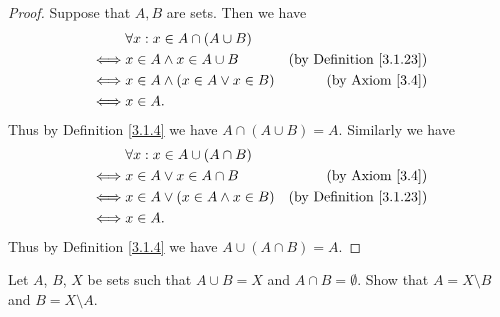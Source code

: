 \begin{proof}
    Suppose that \(A, B\) are sets.
    Then we have
    \begin{align*}
             & \forall x : x \in A \cap (A \cup B)                                        \\
        \iff & x \in A \land x \in A \cup B         & \text{(by Definition \ref{3.1.23})} \\
        \iff & x \in A \land (x \in A \lor x \in B) & \text{(by Axiom \ref{3.4})}         \\
        \iff & x \in A.
    \end{align*}
    Thus by Definition \ref{3.1.4} we have \(A \cap (A \cup B) = A\).
    Similarly we have
    \begin{align*}
             & \forall x : x \in A \cup (A \cap B)                                        \\
        \iff & x \in A \lor x \in A \cap B          & \text{(by Axiom \ref{3.4})}         \\
        \iff & x \in A \lor (x \in A \land x \in B) & \text{(by Definition \ref{3.1.23})} \\
        \iff & x \in A.
    \end{align*}
    Thus by Definition \ref{3.1.4} we have \(A \cup (A \cap B) = A\).
\end{proof}

\begin{exercise}\label{ex 3.1.9}
    Let \(A\), \(B\), \(X\) be sets such that \(A \cup B = X\) and \(A \cap B = \emptyset\).
    Show that \(A = X \setminus B\) and \(B = X \setminus A\).
\end{exercise}

